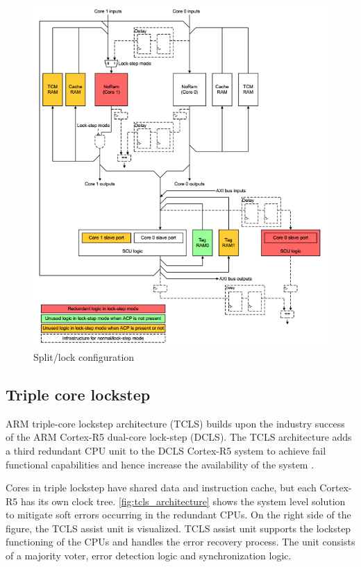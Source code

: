 \begin{figure}[H]

      \centering
      \includegraphics[width=1\linewidth]{images/split_lock_configuration.png}
      \caption{Split/lock configuration \citep{cortex_r8_reference_manual}}
      \label{fig:split_lock_configuration}
    
\end{figure}

\subsection{Triple core lockstep}

ARM triple-core lockstep architecture (TCLS) builds upon the industry success of the ARM Cortex-R5 dual-core lock-step (DCLS). The TCLS architecture adds a third redundant CPU unit to the DCLS Cortex-R5 system to achieve fail functional capabilities and hence increase the availability of the system \citep{TCLS_cortex_r}.

Cores in triple lockstep have shared data and instruction cache, but each Cortex-R5 has its own clock tree. \autoref{fig:tcls_architecture} shows the system level solution to mitigate soft errors occurring in the redundant CPUs. On the right side of the figure, the TCLS assist unit is visualized. TCLS assist unit supports the lockstep functioning of the CPUs and handles the error recovery process. The unit consists of a majority voter, error detection logic and synchronization logic.


